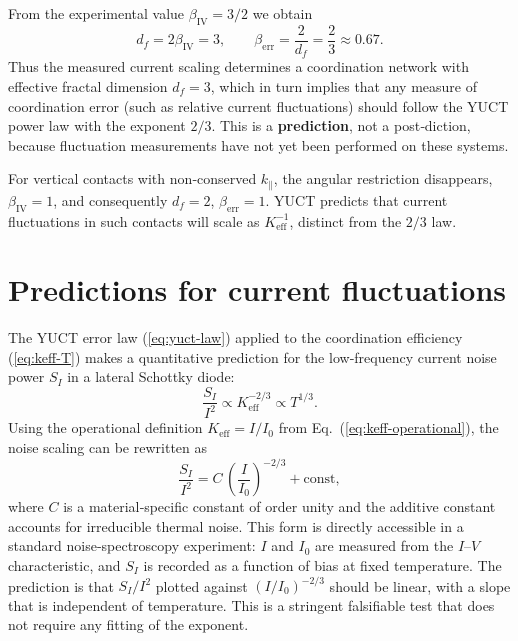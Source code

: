 \documentclass[12pt,a4paper]{article}
\newcommand{\Keff}{K_{\mathrm{eff}}}
\begin{document}
	From the experimental value $\beta_{\mathrm{IV}} = 3/2$ we obtain
	\begin{equation}
		d_f = 2\beta_{\mathrm{IV}} = 3, \qquad
		\beta_{\mathrm{err}} = \frac{2}{d_f} = \frac{2}{3} \approx 0.67.
	\end{equation}
	Thus the measured current scaling determines a coordination network
	with effective fractal dimension $d_f = 3$, which in turn implies
	that any measure of coordination error (such as relative current
	fluctuations) should follow the YUCT power law with the exponent
	$2/3$. This is a \textbf{prediction}, not a post‑diction, because
	fluctuation measurements have not yet been performed on these
	systems.
	
	For vertical contacts with non‑conserved $k_\parallel$, the
	angular restriction disappears, $\beta_{\mathrm{IV}} = 1$, and
	consequently $d_f = 2$, $\beta_{\mathrm{err}} = 1$. YUCT predicts
	that current fluctuations in such contacts will scale as
	$\Keff^{-1}$, distinct from the $2/3$ law.
	
	\section{Predictions for current fluctuations}
	\label{sec:predictions}
	The YUCT error law (\ref{eq:yuct-law}) applied to the coordination
	efficiency (\ref{eq:keff-T}) makes a quantitative prediction for
	the low‑frequency current noise power $S_I$ in a lateral Schottky
	diode:
	\begin{equation}
		\frac{S_I}{I^2} \propto \Keff^{-2/3} \propto T^{1/3}.
		\label{eq:noise-pred}
	\end{equation}
	Using the operational definition $\Keff = I/I_0$ from
	Eq.~(\ref{eq:keff-operational}), the noise scaling can be rewritten as
	\begin{equation}
		\frac{S_I}{I^2} = C \, \left(\frac{I}{I_0}\right)^{-2/3} + \text{const},
		\label{eq:noise-operational}
	\end{equation}
	where $C$ is a material‑specific constant of order unity and the
	additive constant accounts for irreducible thermal noise. This form
	is directly accessible in a standard noise‑spectroscopy experiment:
	$I$ and $I_0$ are measured from the $I$--$V$ characteristic, and
	$S_I$ is recorded as a function of bias at fixed temperature. The
	prediction is that $S_I/I^2$ plotted against $(I/I_0)^{-2/3}$ should
	be linear, with a slope that is independent of temperature. This is
	a stringent falsifiable test that does not require any fitting of
	the exponent.
	
\end{document}
